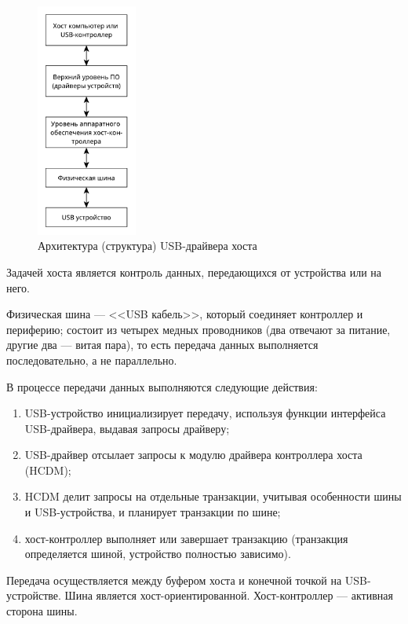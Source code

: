 \begin{figure}[!htb]\centering
	\includegraphics[width=0.295\textwidth]{../img/general_driver.pdf}
	\caption{Архитектура (структура) USB-драйвера хоста}
	\label{img:general_driver}
\end{figure}

\newpage

Задачей хоста является контроль данных, передающихся от устройства или на него.

Физическая шина --- <<USB кабель>>, который соединяет контроллер и периферию; состоит из четырех медных проводников (два отвечают за питание, другие два --- витая пара), то есть передача данных выполняется последовательно, а не параллельно.

В процессе передачи данных выполняются следующие действия:
\begin{enumerate}
	\item USB-устройство инициализирует передачу, используя функции интерфейса USB-драйвера, выдавая запросы драйверу;
	\item USB-драйвер отсылает запросы к модулю драйвера контроллера хоста (HCDM);
	\item HCDM делит запросы на отдельные транзакции, учитывая особенности шины и USB-устройства, и планирует транзакции по шине;
	\item хост-контроллер выполняет или завершает транзакцию (транзакция определяется шиной, устройство полностью зависимо).
\end{enumerate}

Передача осуществляется между буфером хоста и конечной точкой на USB-устройстве.
Шина является хост-ориентированной.
Хост-контроллер --- активная сторона шины.

